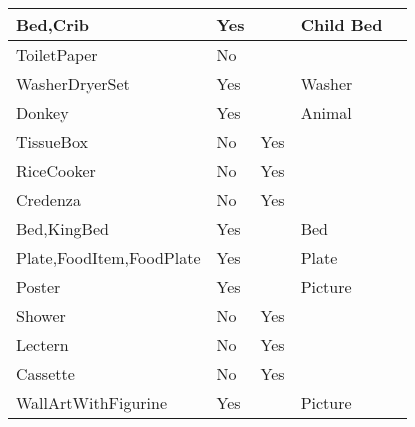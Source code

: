 \documentclass{article}
\begin{document}
\begin{longtable}{|l|l|l|l|l|}
Bed,Crib                                 & Yes              &                                & Child Bed      &                             \\ \hline
ToiletPaper                              & No               &                                &                &                             \\ \hline
WasherDryerSet                           & Yes              &                                & Washer         &                             \\ \hline
Donkey                                   & Yes              &                                & Animal         &                             \\ \hline
TissueBox                                & No               & Yes                            &                &                             \\ \hline
RiceCooker                               & No               & Yes                            &                &                             \\ \hline
Credenza                                 & No               & Yes                            &                &                             \\ \hline
Bed,KingBed                              & Yes              &                                & Bed            &                             \\ \hline
Plate,FoodItem,FoodPlate                 & Yes              &                                & Plate          &                             \\ \hline
Poster                                   & Yes              &                                & Picture        &                             \\ \hline
Shower                                   & No               & Yes                            &                &                             \\ \hline
Lectern                                  & No               & Yes                            &                &                             \\ \hline
Cassette                                 & No               & Yes                            &                &                             \\ \hline
WallArtWithFigurine                      & Yes              &                                & Picture        &                             \\ \hline

\end{longtable}
\end{document}
